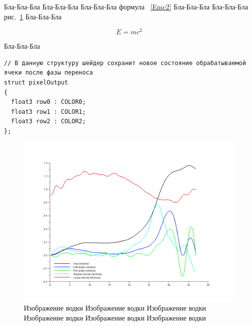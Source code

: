 \documentclass[12pt,a4paper]{report}
\begin{document}
\tableofcontents

Бла-Бла-Бла
Бла-Бла-Бла
Бла-Бла-Бла формула ~\eqref{Emc2}
Бла-Бла-Бла
Бла-Бла-Бла рис.~\ref{br_base_diagram}
Бла-Бла-Бла



\begin{equation}
E = mc^2
\label{Emc2}
\end{equation}

Бла-Бла-Бла


\begin{lstlisting}[caption={Код шейдера фазы переноса}]
// В данную структуру шейдер сохранит новое состояние обрабатываемой ячеки после фазы переноса
struct pixelOutput
{
  float3 row0 : COLOR0;
  float3 row1 : COLOR1;
  float3 row2 : COLOR2;
};
\end{lstlisting}



\begin{figure}[ht]
\includegraphics[width=150mm]{br_base_diagram}
\caption{Изображение водки Изображение водки Изображение водки Изображение водки Изображение водки Изображение водки}
\label{br_base_diagram}
\end{figure}













\end{document}
